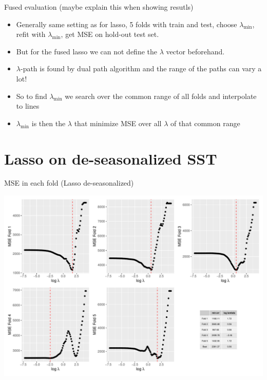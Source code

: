 \documentclass[
  ignorenonframetext,
]{beamer}
\providecommand{\tightlist}{%
  \setlength{\itemsep}{0pt}\setlength{\parskip}{0pt}}
\begin{document}
\begin{frame}{Fused evaluation (maybe explain this when showing
resutls)}
\protect\hypertarget{fused-evaluation-maybe-explain-this-when-showing-resutls}{}
\begin{itemize}
\tightlist
\item
  Generally same setting as for lasso, 5 folds with train and test,
  choose \(\lambda_{\min}\), refit with \(\lambda_{\min}\), get MSE on
  hold-out test set.
\item
  But for the fused lasso we can not define the \(\lambda\) vector
  beforehand.
\item
  \(\lambda\)-path is found by dual path algorithm and the range of the
  paths can vary a lot!
\item
  So to find \(\lambda_{\min}\) we search over the common range of all
  folds and interpolate to lines
\item
  \(\lambda_{\min}\) is then the \(\lambda\) that minimize MSE over all
  \(\lambda\) of that common range
\end{itemize}
\end{frame}

\hypertarget{lasso-on-de-seasonalized-sst}{%
\section{Lasso on de-seasonalized
SST}\label{lasso-on-de-seasonalized-sst}}

\begin{frame}{MSE in each fold (Lasso de-seasonalized)}
\protect\hypertarget{mse-in-each-fold-lasso-de-seasonalized}{}
\begin{center}\includegraphics[width=0.75\linewidth]{ma-presentation_files/figure-beamer/unnamed-chunk-42-1} \end{center}
\end{frame}
\end{document}
